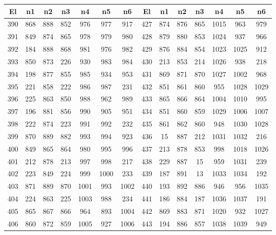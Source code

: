 \begin{apendicesenv}
\begin{table}[H]
	\centering
	\scriptsize
	\begin{tabular}{@{}ccccccc@{\hspace{1.0cm}}ccccccc@{}}
		\toprule
		 \centering El & n1 & n2 & n3 & n4 & n5 & n6 & El & n1 & n2 & n3 & n4 & n5 & n6 \\
		\midrule
		390 &  868 &  888 &  852 &  976 &  977 &  917 & 427 &  874 &  876 &  865 & 1015 &  963 &  979 \\
		391 &  849 &  874 &  865 &  978 &  979 &  980 & 428 &  879 &  880 &  853 & 1024 &  937 &  966 \\
		392 &  184 &  888 &  868 &  981 &  976 &  982 & 429 &  876 &  884 &  854 & 1023 & 1025 &  912 \\
		393 &  850 &  873 &  226 &  930 &  983 &  984 & 430 &  213 &  853 &  214 & 1026 &  938 &  218 \\
		394 &  198 &  877 &  855 &  985 &  934 &  953 & 431 &  869 &  871 &  870 & 1027 & 1002 &  968 \\
		395 &  221 &  858 &  222 &  986 &  987 &  231 & 432 &  851 &  861 &  860 &  955 & 1028 & 1029 \\
		396 &  225 &  863 &  850 &  988 &  962 &  989 & 433 &  865 &  866 &  864 & 1004 & 1010 &  995 \\
		397 &  196 &  881 &  856 &  990 &  905 &  951 & 434 &  851 &  860 &  859 & 1029 & 1006 & 1007 \\
		398 &  222 &  874 &  223 &  991 &  992 &  232 & 435 &  861 &  862 &  860 &  948 & 1030 & 1028 \\
		399 &  870 &  889 &  882 &  993 &  994 &  923 & 436 &   15 &  887 &  212 & 1031 & 1032 &  216 \\
		400 &  849 &  865 &  864 &  980 &  995 &  996 & 437 &  213 &  878 &  853 &  998 & 1018 & 1026 \\
		401 &  212 &  878 &  213 &  997 &  998 &  217 & 438 &  229 &  887 &   15 &  959 & 1031 &  239 \\
		402 &  223 &  849 &  224 &  999 & 1000 &  233 & 439 &  187 &  891 &   13 & 1033 & 1034 &  192 \\
		403 &  871 &  889 &  870 & 1001 &  993 & 1002 & 440 &  193 &  892 &  886 &  946 &  956 & 1035 \\
		404 &  224 &  863 &  225 & 1003 &  988 &  234 & 441 &  186 &  884 &  187 & 1036 & 1037 &  191 \\
		405 &  865 &  867 &  866 &  964 &  893 & 1004 & 442 &  869 &  883 &  871 & 1020 &  932 & 1027 \\
		406 &  860 &  872 &  859 & 1005 &  927 & 1006 & 443 &  194 &  886 &  857 & 1038 & 1039 &  949 \\

\end{tabular}
\end{table}
\end{apendicesenv}
